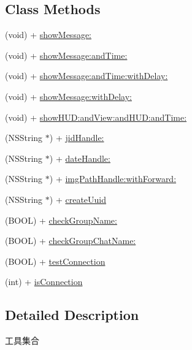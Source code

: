 \subsection*{Class Methods}
\begin{DoxyCompactItemize}
\item 
(void) + \mbox{\hyperlink{interface_tools_a70f7dfa59f08955e4d44de2245914ed1}{show\+Message\+:}}
\item 
(void) + \mbox{\hyperlink{interface_tools_a86359d5e764207dc442d96e85579b637}{show\+Message\+:and\+Time\+:}}
\item 
(void) + \mbox{\hyperlink{interface_tools_ab8cd6d19b8b8ca7d647306f6d5611d0d}{show\+Message\+:and\+Time\+:with\+Delay\+:}}
\item 
(void) + \mbox{\hyperlink{interface_tools_ab9fcfbb218e3e4e5299c292827944070}{show\+Message\+:with\+Delay\+:}}
\item 
(void) + \mbox{\hyperlink{interface_tools_ab01abacd7bee2d39ab2c4c067d2a47f4}{show\+H\+U\+D\+:and\+View\+:and\+H\+U\+D\+:and\+Time\+:}}
\item 
(N\+S\+String $\ast$) + \mbox{\hyperlink{interface_tools_a7171f876560060564ffbeaa8ae0eadcf}{jid\+Handle\+:}}
\item 
(N\+S\+String $\ast$) + \mbox{\hyperlink{interface_tools_ad2c2f6dee3ae9f63642291056d8c3f40}{date\+Handle\+:}}
\item 
(N\+S\+String $\ast$) + \mbox{\hyperlink{interface_tools_aecf6c8b3eac4e47295e0c89fcbb3cbc3}{img\+Path\+Handle\+:with\+Forward\+:}}
\item 
(N\+S\+String $\ast$) + \mbox{\hyperlink{interface_tools_a8ed4d3ec35619bf99597545eee94babc}{create\+Uuid}}
\item 
(B\+O\+OL) + \mbox{\hyperlink{interface_tools_a72ce36fa142481b701d46cee384d719e}{check\+Group\+Name\+:}}
\item 
(B\+O\+OL) + \mbox{\hyperlink{interface_tools_a15f46d611b1759ae536ea183050b7f42}{check\+Group\+Chat\+Name\+:}}
\item 
(B\+O\+OL) + \mbox{\hyperlink{interface_tools_a3a7c4c8f069ac8ead6d0acae85ca40b8}{test\+Connection}}
\item 
(int) + \mbox{\hyperlink{interface_tools_a72688197a3180b11a3d2fcb4f0719838}{is\+Connection}}
\end{DoxyCompactItemize}


\subsection{Detailed Description}
工具集合 

